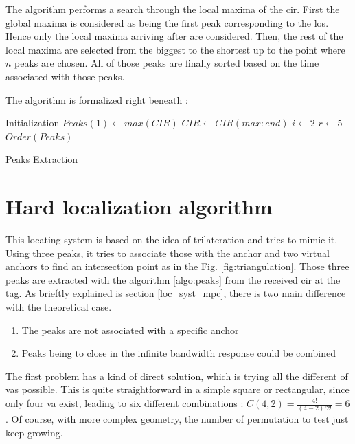 The algorithm performs a search through the local maxima of the \gls{cir}. First the global maxima is considered as being the first peak corresponding to the \gls{los}. Hence only the local maxima arriving after are considered. Then, the rest of the local maxima are selected from the biggest to the shortest up to the point where $n$ peaks are chosen. All of those peaks are finally sorted based on the time associated with those peaks. 

The algorithm is formalized right beneath :
\vspace{2mm}

\begin{algorithm}[H]
Initialization\;
$Peaks(1) \longleftarrow max(CIR)$\;
$CIR \longleftarrow CIR(max:end)$\;
$i \longleftarrow 2$\;
$r \longleftarrow 5$\;
 $Order(Peaks)$
 \caption{Peaks Extraction \label{algo:peaks}}
\end{algorithm}

\section{Hard localization algorithm}

This locating system is based on the idea of trilateration and tries to mimic it. Using three peaks, it tries to associate those with the anchor and two virtual anchors to find an intersection point as in the Fig. \ref{fig:triangulation}. Those three peaks are extracted with the algorithm \ref{algo:peaks} from the received \gls{cir} at the tag. As brieftly explained is section \ref{loc_syst_mpc}, there is two main difference with the theoretical case.

\begin{enumerate}
\item The peaks are not associated with a specific anchor
\item Peaks being to close in the infinite bandwidth response could be combined
\end{enumerate}

The first problem has a kind of direct solution, which is trying all the different  of \gls{vas} possible. This is quite straightforward in a simple square or rectangular, since only four \gls{va} exist, leading to six different combinations : $C(4,2) = \frac{4!}{(4-2)!2!} = 6$. Of course, with more complex geometry, the number of permutation to test just keep growing.
\vspace{2mm}


